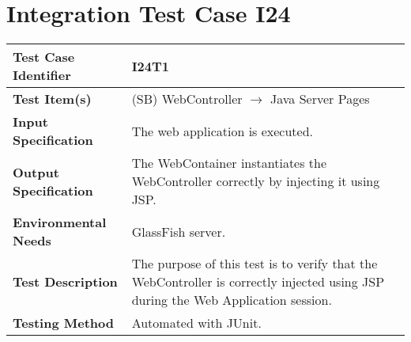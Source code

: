 \section{Integration Test Case I24}

\begin{longtable}{p{} | p{}}
\textbf{Test Case Identifier} & I24T1\\
\hline
\textbf{Test Item(s)} & (SB) WebController $\rightarrow$ Java Server Pages \\
\hline
\textbf{Input Specification} & The web application is executed. \\
\hline
\textbf{Output Specification} & The WebContainer instantiates the WebController correctly by injecting it using JSP. \\
\hline
\textbf{Environmental Needs} & GlassFish server. \\
\hline
\textbf{Test Description} & The purpose of this test is to verify that the WebController is correctly injected using JSP during the Web Application session. \\
\hline
\textbf{Testing Method} & Automated with JUnit. \\
\hline
\end{longtable}